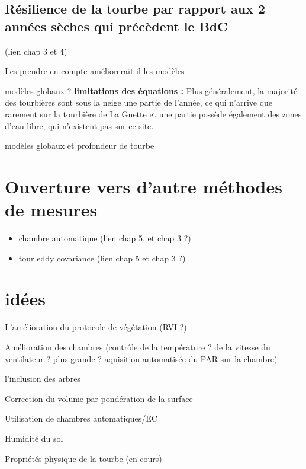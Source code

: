 \subsection*{Résilience de la tourbe par rapport aux 2 années sèches qui précèdent le BdC}
(lien chap 3 et 4)

%
%
%
%


Les prendre en compte améliorerait-il les modèles

modèles globaux ?
\textbf{limitations des équations :}
Plus généralement, la majorité des tourbières sont sous la neige une partie de l'année, ce qui n'arrive que rarement sur la tourbière de La Guette et une partie possède également des zones d'eau libre, qui n'existent pas sur ce site.

modèles globaux et profondeur de tourbe


\section*{Ouverture vers d'autre méthodes de mesures}
\begin{itemize}
\item chambre automatique (lien chap 5, et chap 3 ?)
\item tour eddy covariance (lien chap 5 et chap 3 ?)
\end{itemize}



\section*{idées}

L'amélioration du protocole de végétation (RVI ?)

Amélioration des chambres (contrôle de la température ? de la vitesse du ventilateur ? plus grande ? aquisition automatisée du PAR sur la chambre)

l'inclusion des arbres

Correction du volume par pondération de la surface

Utilisation de chambres automatiques/EC

Humidité du sol

Propriétés physique de la tourbe (en cours)

